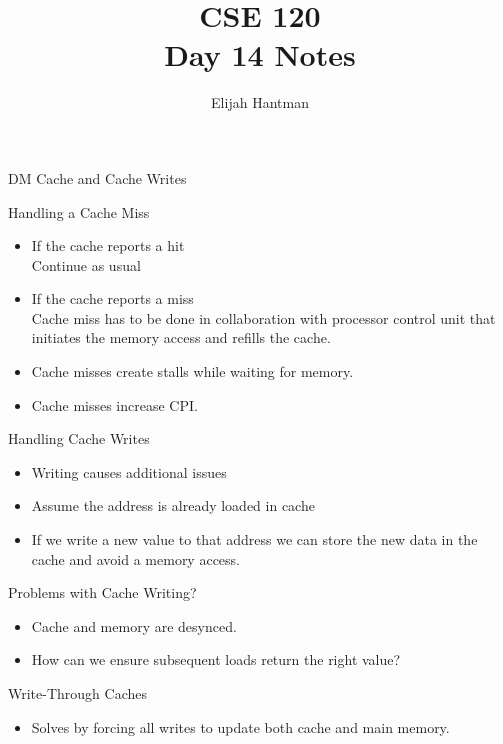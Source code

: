 \documentclass{report}
\title{\Huge{CSE 120}\\Day 14 Notes}
\author{\huge{Elijah Hantman}}
\date{}
\begin{document}
\maketitle
\newpage

\begin{description}
    \item {\huge DM Cache and Cache Writes} 
    \item {\large Handling a Cache Miss}
        \begin{itemize}
            \item If the cache reports a hit
                \\
                Continue as usual
            \item If the cache reports a miss
                \\
                Cache miss has to be done in collaboration
                with processor control unit that initiates the
                memory access and refills the cache.
            \item Cache misses create stalls while waiting for
                memory.
            \item Cache misses increase CPI.
        \end{itemize}
    \item {\large Handling Cache Writes}
        \begin{itemize}
            \item Writing causes additional issues
            \item Assume the address is already loaded in cache
            \item If we write a new value to that address we
                can store the new data in the cache and avoid
                a memory access.
        \end{itemize}
    \item {\large Problems with Cache Writing?}
        \begin{itemize}
            \item Cache and memory are desynced.
            \item How can we ensure subsequent loads return the
                right value?
        \end{itemize}
    \item {\large Write-Through Caches}
        \begin{itemize}
            \item Solves by forcing all writes to update both
                cache and main memory.

\end{itemize}
\end{description}
\end{document}
